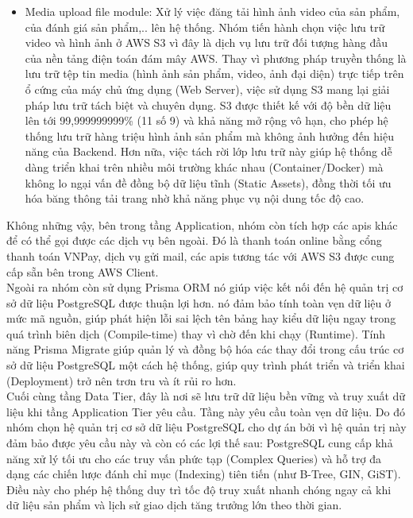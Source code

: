 \begin{itemize}
	\item Media upload file module: Xử lý việc đăng tải hình ảnh video của sản phẩm, của đánh giá sản phẩm,.. lên hệ thống. Nhóm tiến hành chọn việc lưu trữ video và hình ảnh ở AWS S3 vì đây là dịch vụ lưu trữ đối tượng hàng đầu của nền tảng điện toán đám mây AWS. Thay vì phương
	      pháp truyền thống là lưu trữ tệp tin media (hình ảnh sản phẩm, video, ảnh đại diện) trực tiếp trên ổ cứng của máy
	      chủ ứng dụng (Web Server), việc sử dụng S3 mang lại giải pháp lưu trữ tách biệt và chuyên dụng.
	      S3 được thiết kế với độ bền dữ liệu lên tới 99,999999999\% (11 số 9) và khả năng mở rộng vô hạn, cho phép
	      hệ thống lưu trữ hàng triệu hình ảnh sản phẩm mà không ảnh hưởng đến hiệu năng của Backend. Hơn nữa, việc
	      tách rời lớp lưu trữ này giúp hệ thống dễ dàng triển khai trên nhiều môi trường khác nhau (Container/Docker) mà
	      không lo ngại vấn đề đồng bộ dữ liệu tĩnh (Static Assets), đồng thời tối ưu hóa băng thông tải trang nhờ khả năng
	      phục vụ nội dung tốc độ cao.
\end{itemize}

Không những vậy, bên trong tầng Application, nhóm còn tích hợp các apis khác để có thể gọi được các dịch vụ bên ngoài. Đó là thanh toán online bằng cổng thanh toán VNPay, dịch vụ gửi mail, các apis tương tác với AWS S3 được cung cấp sẵn bên trong AWS Client. \\

Ngoài ra nhóm còn sử dụng Prisma ORM nó giúp việc kết nối đến hệ quản trị cơ sở dữ liệu PostgreSQL được thuận lợi hơn. nó đảm bảo tính toàn vẹn dữ liệu ở mức mã nguồn, giúp phát hiện lỗi sai lệch tên bảng hay kiểu dữ liệu ngay trong quá trình biên dịch (Compile-time) thay vì chờ đến khi chạy (Runtime). Tính năng Prisma Migrate giúp quản lý và đồng bộ hóa các thay đổi trong cấu trúc cơ sở dữ liệu PostgreSQL một cách hệ thống, giúp quy trình phát triển và triển khai (Deployment) trở nên trơn tru và ít rủi ro hơn. \\

Cuối cùng tầng Data Tier, đây là nơi sẽ lưu trữ dữ liệu bền vững và truy xuất dữ liệu khi tầng Application Tier yêu cầu. Tầng này yêu cầu toàn vẹn dữ liệu. Do đó nhóm chọn hệ quản trị cơ sở dữ liệu PostgreSQL cho dự án bởi vì hệ quản trị này đảm bảo được yêu cầu này và còn có các lợi thế sau: PostgreSQL cung cấp khả năng xử lý tối ưu cho các truy vấn phức tạp (Complex Queries) và hỗ trợ đa dạng các chiến lược đánh chỉ mục (Indexing) tiên tiến (như B-Tree, GIN, GiST). Điều này cho phép hệ thống duy trì tốc độ truy xuất nhanh chóng ngay cả khi dữ liệu sản phẩm và lịch sử giao dịch tăng trưởng lớn theo thời gian. \\


